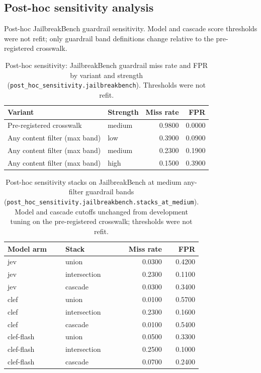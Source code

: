 \subsection{Post-hoc sensitivity analysis}
\label{sec:post-hoc-appendix}

Post-hoc JailbreakBench guardrail sensitivity. Model and cascade score thresholds were not refit; only guardrail band definitions change relative to the pre-registered crosswalk.

\begin{table}[htbp]
\centering
\caption{Post-hoc sensitivity: JailbreakBench guardrail miss rate and FPR by variant and strength (\texttt{post\_hoc\_sensitivity.jailbreakbench}). Thresholds were not refit.}
\label{tab:post-hoc-any-filter}
\small
\begin{tabular}{@{}llrr@{}}
\toprule
Variant & Strength & Miss rate & FPR \\
\midrule
Pre-registered crosswalk & medium & 0.9800 & 0.0000 \\
Any content filter (max band) & low & 0.3900 & 0.0900 \\
Any content filter (max band) & medium & 0.2300 & 0.1900 \\
Any content filter (max band) & high & 0.1500 & 0.3900 \\
\bottomrule
\end{tabular}
\end{table}

\begin{table}[htbp]
\centering
\caption{Post-hoc sensitivity stacks on JailbreakBench at medium any-filter guardrail bands (\texttt{post\_hoc\_sensitivity.jailbreakbench.stacks\_at\_medium}). Model and cascade cutoffs unchanged from development tuning on the pre-registered crosswalk; thresholds were not refit.}
\label{tab:post-hoc-stacks}
\small
\begin{tabular}{@{}llrr@{}}
\toprule
Model arm & Stack & Miss rate & FPR \\
\midrule
jev & union & 0.0300 & 0.4200 \\
jev & intersection & 0.2300 & 0.1100 \\
jev & cascade & 0.0300 & 0.3400 \\
clef & union & 0.0100 & 0.5700 \\
clef & intersection & 0.2300 & 0.1600 \\
clef & cascade & 0.0100 & 0.5400 \\
clef-flash & union & 0.0500 & 0.3300 \\
clef-flash & intersection & 0.2500 & 0.1000 \\
clef-flash & cascade & 0.0700 & 0.2400 \\
\bottomrule
\end{tabular}
\end{table}

